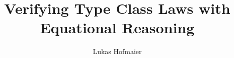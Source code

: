 \documentclass[twoside, a4paper, x11names]{article}
\author{Lukas Hofmaier}
\title{Verifying Type Class Laws with Equational Reasoning}
\begin{document}
\maketitle










\printglossary
\end{document}
